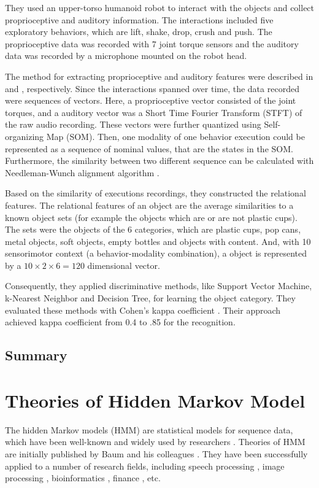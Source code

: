 \documentclass[12pt,final,twoside]{report}
\theoremstyle{plain}
\theoremstyle{definition}
\theoremstyle{remark}
\begin{document}
They used an upper-torso humanoid robot to interact with the objects and collect proprioceptive and auditory information. The interactions included five exploratory behaviors, which are lift, shake, drop, crush and push. The proprioceptive data was recorded with 7 joint torque sensors and the auditory data was recorded by a microphone mounted on the robot head.

The method for extracting proprioceptive and auditory features were described in \cite{bergquist_interactive_2009} and \cite{sinapov_interactive_2009}, respectively. Since the interactions spanned over time, the data recorded were sequences of vectors. Here, a proprioceptive vector consisted of the joint torques, and a auditory vector was a Short Time Fourier Transform (STFT) of the raw audio recording. These vectors were further quantized using Self-organizing Map (SOM). Then, one modality of one behavior execution could be represented as a sequence of nominal values, that are the states in the SOM. Furthermore, the similarity between two different sequence can be calculated with Needleman-Wunch alignment algorithm \cite{needleman_general_1970}.

Based on the similarity of executions recordings, they constructed the relational features. The relational features of an object are the average similarities to a known object sets (for example the objects which are or are not plastic cups). The sets were the objects of the 6 categories, which are plastic cups, pop cans, metal objects, soft objects, empty bottles and objects with content. And, with 10 sensorimotor context (a behavior-modality combination), a object is represented by a $10 \times 2 \times 6 = 120$ dimensional vector.

Consequently, they applied discriminative methods, like Support Vector Machine, k-Nearest Neighbor and Decision Tree, for learning the object category. They evaluated these methods with Cohen's kappa coefficient \cite{cohen_coefficient_1960}. Their approach achieved kappa coefficient from 0.4 to .85 for the recognition.

\section{Summary}

\cleardoublepage
\chapter{Theories of Hidden Markov Model}
The hidden Markov models (HMM) are statistical models for sequence data, which have been well-known and widely used by researchers \cite{rabiner_tutorial_1989, rabiner_fundamentals_1993}. Theories of HMM are initially published by Baum and his colleagues \cite{baum_statistical_1966, baum_maximization_1970}. They have been successfully applied to a number of research fields, including speech processing \cite{baker_dragon_1975, rabiner_fundamentals_1993}, image processing \cite{chen_off-line_1994}, bioinformatics \cite{koski_hidden_2001}, finance \cite{bhar_hidden_2004}, etc.
\end{document}
